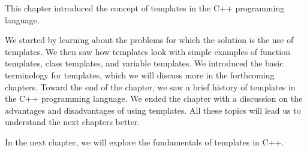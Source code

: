 This chapter introduced the concept of templates in the C++ programming language.

We started by learning about the problems for which the solution is the use of templates. We then saw how templates look with simple examples of function templates, class templates, and variable templates. We introduced the basic terminology for templates, which we will discuss more in the forthcoming chapters. Toward the end of the chapter, we saw a brief history of templates in the C++ programming language. We ended the chapter with a discussion on the advantages and disadvantages of using templates. All these topics will lead us to understand the next chapters better.

In the next chapter, we will explore the fundamentals of templates in C++.